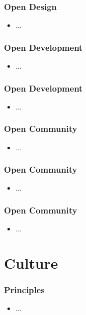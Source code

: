 \documentclass[aspectratio=169,11pt,hyperref={colorlinks=true}]{beamer}
\begin{document}
\begin{frame}
  \frametitle{Open Design}
    \begin{itemize}
        \item{...}
    \end{itemize}
\end{frame}

\begin{frame}
  \frametitle{Open Development}
    \begin{itemize}
        \item{...}
    \end{itemize}
\end{frame}

\begin{frame}
  \frametitle{Open Development}
    \begin{itemize}
        \item{...}
    \end{itemize}
\end{frame}

\begin{frame}
  \frametitle{Open Community}
    \begin{itemize}
        \item{...}
    \end{itemize}
\end{frame}

\begin{frame}
  \frametitle{Open Community}
    \begin{itemize}
        \item{...}
    \end{itemize}
\end{frame}

\begin{frame}
  \frametitle{Open Community}
    \begin{itemize}
        \item{...}
    \end{itemize}
\end{frame}

\section{Culture}

\begin{frame}
  \frametitle{Principles}
    \begin{itemize}
        \item{...}
    \end{itemize}
\end{frame}
\end{document}
